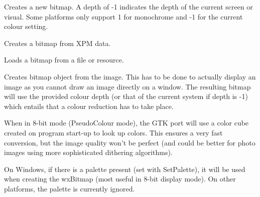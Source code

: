 
Creates a new bitmap. A depth of -1 indicates the depth of the current screen
or visual. Some platforms only support 1 for monochrome and -1 for the current
colour setting.


Creates a bitmap from XPM data.


Loads a bitmap from a file or resource.


Creates bitmap object from the image. This has to be done
to actually display an image as you cannot draw an image directly on a window.
The resulting bitmap will use the provided colour depth (or that of the
current system if depth is -1) which entails that a colour reduction has
to take place.

When in 8-bit mode (PseudoColour mode), the GTK port will use a color cube created
on program start-up to look up colors. This ensures a very fast conversion, but
the image quality won't be perfect (and could be better for photo images using more
sophisticated dithering algorithms).

On Windows, if there is a palette present (set with SetPalette), it will be used when
creating the wxBitmap (most useful in 8-bit display mode). On other platforms,
the palette is currently ignored.







